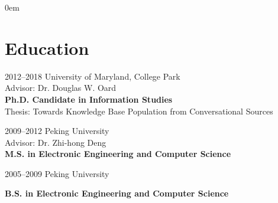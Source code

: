 \documentclass[a4paper, 11pt]{article}
\begin{document}
\large
\parindent 0em
\thispagestyle{myheadings}

   \makecvtitle


\section{Education}

\begin{CV}
\item[2012--2018] University of Maryland, College Park\\
Advisor: Dr. Douglas W. Oard\\
\textbf{Ph.D. Candidate in Information Studies}\\
Thesis: Towards Knowledge Base Population from Conversational Sources
\vspace{2mm}

\item[2009--2012] Peking University\\
 Advisor: Dr. Zhi-hong Deng\\
\textbf{M.S. in Electronic Engineering and Computer Science}
\vspace{2mm}

\item[2005--2009] Peking University

\textbf{B.S. in Electronic Engineering and Computer Science}
\end{CV}
\vspace{-1mm}









\vspace{-1mm}
\end{document}
